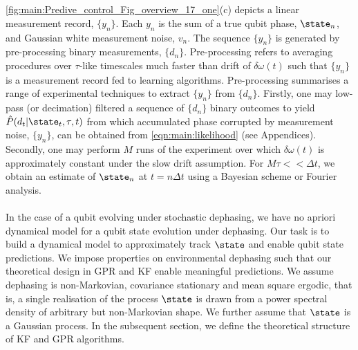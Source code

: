 \\
\\
\cref{fig:main:Predive_control_Fig_overview_17_one}(c) depicts a linear measurement record, $\{ y_n\}$.  Each $y_n$ is the sum of a true qubit phase, $\state_n$, and Gaussian white measurement noise, $v_n$.  The sequence $\{ y_n\}$ is generated by pre-processing binary measurements, $\{ d_n\}$. Pre-processing refers to averaging procedures over $\tau$-like timescales much faster than drift of $\delta \omega (t)$ such that $\{ y_n\}$ is a measurement record fed to learning algorithms. Pre-processing summarises a range of experimental techniques to extract $\{ y_n\}$ from $\{ d_n\}$. Firstly, one may low-pass (or decimation) filtered a sequence of $\{ d_n\}$ binary outcomes to yield $\hat{P}(d_t | \state_t, \tau, t)$ from which accumulated phase corrupted by measurement noise, $\{ y_n\}$, can be obtained from \cref{eqn:main:likelihood} (see Appendices). Secondly, one may perform $M$ runs of the experiment over which $\delta \omega (t)$ is approximately constant under the slow drift assumption. For $M\tau << \Delta t$, we obtain an estimate of  $\state_n$ at $t = n \Delta t $ using a Bayesian scheme or Fourier analysis. 
\\
\\
In the case of a qubit evolving under stochastic dephasing, we have no apriori dynamical model for a qubit state evolution under dephasing. Our task is to build a dynamical model to approximately track $\state$ and enable qubit state predictions. We impose properties on environmental dephasing such that our theoretical design in GPR and KF enable meaningful predictions. We assume dephasing is non-Markovian, covariance stationary and mean square ergodic, that is, a single realisation of the process $\state$ is drawn from a power spectral density of arbitrary but non-Markovian shape. We further assume that $\state$  is a Gaussian process. In the subsequent section, we define the theoretical structure of KF and GPR algorithms. 

